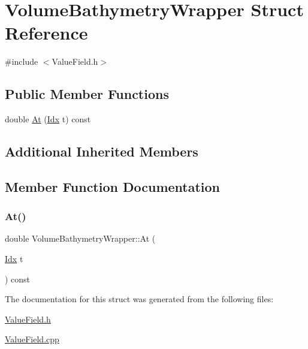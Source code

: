 \hypertarget{structVolumeBathymetryWrapper}{}\section{Volume\+Bathymetry\+Wrapper Struct Reference}
\label{structVolumeBathymetryWrapper}


{\ttfamily \#include $<$Value\+Field.\+h$>$}

\subsection*{Public Member Functions}
\begin{DoxyCompactItemize}
\item 
double \hyperlink{structVolumeBathymetryWrapper_a67d0ecfc0f8e5030973923d5b0fde7f6}{At} (\hyperlink{Includes_8h_ae78891cd308078a2f5f9e7193065c805}{Idx} t) const
\end{DoxyCompactItemize}
\subsection*{Additional Inherited Members}


\subsection{Member Function Documentation}
\mbox{\label{structVolumeBathymetryWrapper_a67d0ecfc0f8e5030973923d5b0fde7f6}} 
\subsubsection{\texorpdfstring{At()}{At()}}
{\footnotesize\ttfamily double Volume\+Bathymetry\+Wrapper\+::\+At (\begin{DoxyParamCaption}\item[{\hyperlink{Includes_8h_ae78891cd308078a2f5f9e7193065c805}{Idx}}]{t }\end{DoxyParamCaption}) const}



The documentation for this struct was generated from the following files\+:\begin{DoxyCompactItemize}
\item 
\hyperlink{ValueField_8h}{Value\+Field.\+h}\item 
\hyperlink{ValueField_8cpp}{Value\+Field.\+cpp}\end{DoxyCompactItemize}

